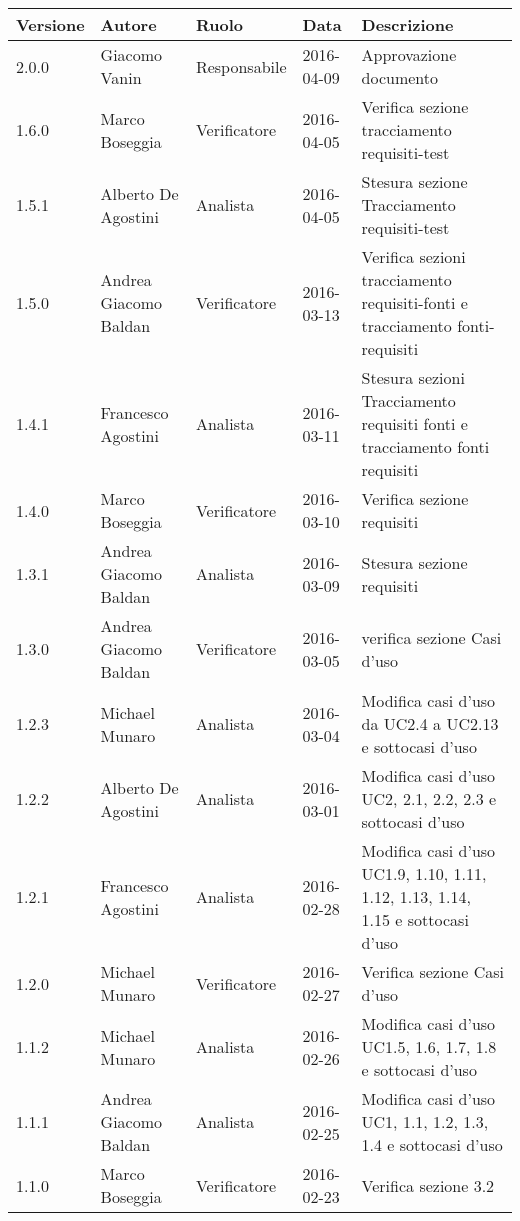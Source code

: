 \documentclass{scalatekids-article}
\begin{document}
\vspace{0cm}
\begin{center}
  \begin{tabular}{| l | l | l | l | p{5cm} |}
    \hline
    Versione & Autore & Ruolo & Data & Descrizione \\
    \hline
    2.0.0 & Giacomo Vanin & Responsabile & 2016-04-09 & Approvazione documento\\
    \hline
    1.6.0 & Marco Boseggia & Verificatore & 2016-04-05 & Verifica sezione tracciamento requisiti-test\\
    \hline
    1.5.1 & Alberto De Agostini & Analista & 2016-04-05 & Stesura sezione Tracciamento requisiti-test\\
    \hline
    1.5.0 & Andrea Giacomo Baldan & Verificatore & 2016-03-13 & Verifica sezioni tracciamento requisiti-fonti e tracciamento fonti-requisiti\\
    \hline
    1.4.1 & Francesco Agostini & Analista & 2016-03-11 & Stesura sezioni Tracciamento requisiti fonti e tracciamento fonti requisiti\\
    \hline
    1.4.0 & Marco Boseggia & Verificatore & 2016-03-10 & Verifica sezione requisiti\\
    \hline
    1.3.1 & Andrea Giacomo Baldan & Analista & 2016-03-09 & Stesura sezione requisiti\\
    \hline
    1.3.0 & Andrea Giacomo Baldan & Verificatore & 2016-03-05 & verifica sezione Casi d'uso\\
    \hline
    1.2.3 & Michael Munaro & Analista & 2016-03-04 & Modifica casi d'uso da UC2.4 a UC2.13 e sottocasi d'uso\\
    \hline
    1.2.2 & Alberto De Agostini & Analista & 2016-03-01 & Modifica casi d'uso UC2, 2.1, 2.2, 2.3 e sottocasi d'uso\\
    \hline
    1.2.1 & Francesco Agostini & Analista & 2016-02-28 & Modifica casi d'uso UC1.9, 1.10, 1.11, 1.12, 1.13, 1.14, 1.15 e sottocasi d'uso\\
    \hline
    1.2.0 & Michael Munaro & Verificatore & 2016-02-27 & Verifica sezione Casi d'uso\\
    \hline
    1.1.2 & Michael Munaro & Analista & 2016-02-26 & Modifica casi d'uso UC1.5, 1.6, 1.7, 1.8 e sottocasi d'uso\\
    \hline
    1.1.1 & Andrea Giacomo Baldan & Analista & 2016-02-25 & Modifica casi d'uso UC1, 1.1, 1.2, 1.3, 1.4 e sottocasi d'uso\\
    \hline
    1.1.0 & Marco Boseggia & Verificatore & 2016-02-23 & Verifica sezione 3.2\\

\end{tabular}
\end{center}
\end{document}
